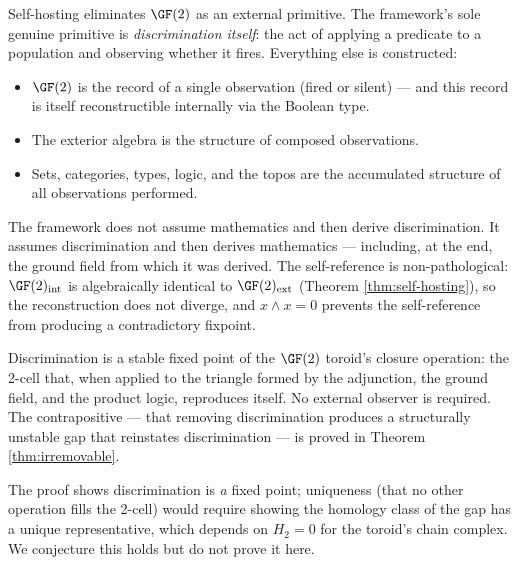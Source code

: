 \begin{remark}
Self-hosting eliminates $\GF(2)$ as an external primitive.
The framework's sole genuine primitive is
\emph{discrimination itself}: the act of applying a
predicate to a population and observing whether it fires.
Everything else is constructed:
\begin{itemize}[nosep]
  \item $\GF(2)$ is the record of a single observation
    (fired or silent) --- and this record is itself
    reconstructible internally via the Boolean type.
  \item The exterior algebra is the structure of composed
    observations.
  \item Sets, categories, types, logic, and the topos are
    the accumulated structure of all observations
    performed.
\end{itemize}
The framework does not assume mathematics and then derive
discrimination. It assumes discrimination and then derives
mathematics --- including, at the end, the ground field
from which it was derived. The self-reference is
non-pathological: $\GF(2)_{\mathrm{int}}$ is
algebraically identical to $\GF(2)_{\mathrm{ext}}$
(Theorem \ref{thm:self-hosting}), so the reconstruction
does not diverge, and $x \wedge x = 0$ prevents the
self-reference from producing a contradictory fixpoint.
\end{remark}

\begin{theorem}
\label{thm:entailed}
Discrimination is a stable fixed point of the
$\GF(2)$ toroid's closure operation: the 2-cell that,
when applied to the triangle formed by the adjunction,
the ground field, and the product logic, reproduces
itself. No external observer is required. The
contrapositive --- that removing discrimination produces
a structurally unstable gap that reinstates
discrimination --- is proved in Theorem
\ref{thm:irremovable}.

The proof shows discrimination is \emph{a} fixed point;
uniqueness (that no other operation fills the 2-cell)
would require showing the homology class of the gap has
a unique representative, which depends on $H_2 = 0$ for
the toroid's chain complex. We conjecture this holds but
do not prove it here.
\end{theorem}

